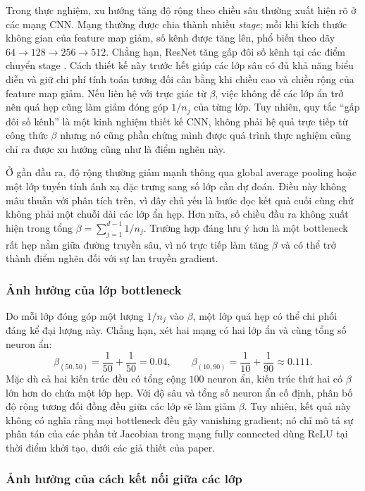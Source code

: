 \documentclass[12pt]{article}
\begin{document}
Trong thực nghiệm, xu hướng tăng độ rộng theo chiều sâu thường xuất hiện rõ ở
các mạng CNN. Mạng thường được chia thành nhiều
\textit{stage}; mỗi khi kích thước không gian của feature map giảm, số kênh
được tăng lên, phổ biến theo dãy $64\rightarrow128\rightarrow256\rightarrow512$.
Chẳng hạn, ResNet tăng gấp đôi số kênh tại các điểm chuyển stage
\cite{he2016identity}. Cách thiết kế này trước hết giúp các lớp sâu có đủ khả
năng biểu diễn và giữ chi phí tính toán tương đối cân bằng khi chiều cao và
chiều rộng của feature map giảm. Nếu liên hệ với trực giác từ $\beta$, việc
không để các lớp ẩn trở nên quá hẹp cũng làm giảm đóng góp $1/n_j$ của từng
lớp. Tuy nhiên, quy tắc ``gấp đôi số kênh'' là một kinh nghiệm thiết kế CNN,
không phải hệ quả trực tiếp từ công thức $\beta$ nhưng nó cũng phần chứng mình
được quá trình thực nghiệm cũng chỉ ra được xu hướng cũng như là điểm nghẽn này.

Ở gần đầu ra, độ rộng thường giảm mạnh thông qua global average pooling hoặc
một lớp tuyến tính ánh xạ đặc trưng sang số lớp cần dự đoán. Điều này không mâu
thuẫn với phân tích trên, vì đây chủ yếu là bước đọc kết quả cuối cùng chứ không
phải một chuỗi dài các lớp ẩn hẹp. Hơn nữa, số chiều đầu ra không xuất hiện
trong tổng $\beta=\sum_{j=1}^{d-1}1/n_j$. Trường hợp đáng lưu ý hơn là một
bottleneck rất hẹp nằm giữa đường truyền sâu, vì nó trực tiếp làm tăng $\beta$
và có thể trở thành điểm nghẽn đối với sự lan truyền gradient.

\subsubsection{Ảnh hưởng của lớp bottleneck}

Do mỗi lớp đóng góp một lượng $1/n_j$ vào $\beta$, một lớp quá hẹp có thể chi
phối đáng kể đại lượng này. Chẳng hạn, xét hai mạng có hai lớp ẩn và cùng tổng
số neuron ẩn:
\[
    \beta_{(50,50)}
    =\frac{1}{50}+\frac{1}{50}=0.04,
    \qquad
    \beta_{(10,90)}
    =\frac{1}{10}+\frac{1}{90}\approx0.111.
\]
Mặc dù cả hai kiến trúc đều có tổng cộng $100$ neuron ẩn, kiến trúc thứ hai có
$\beta$ lớn hơn do chứa một lớp hẹp. Với độ sâu và tổng số neuron ẩn cố định,
phân bố độ rộng tương đối đồng đều giữa các lớp sẽ làm giảm $\beta$. Tuy nhiên,
kết quả này không có nghĩa rằng mọi bottleneck đều gây vanishing gradient; nó
chỉ mô tả sự phân tán của các phần tử Jacobian trong mạng fully connected dùng
ReLU tại thời điểm khởi tạo, dưới các giả thiết của paper.

\subsubsection{Ảnh hưởng của cách kết nối giữa các lớp}
\end{document}
